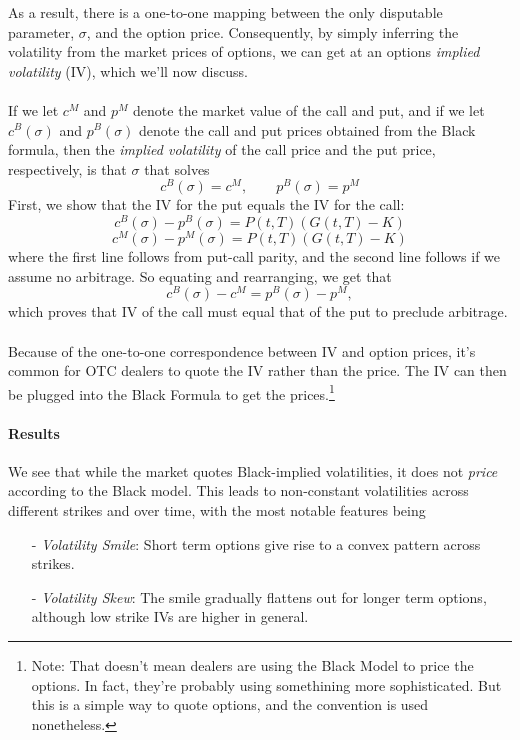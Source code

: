 \documentclass[12pt]{article}
\theoremstyle{plain}
\theoremstyle{definition}
\theoremstyle{remark}
\begin{document}
As a result, there is a one-to-one
mapping between the only disputable parameter, $\sigma$, and the
option price. Consequently, by simply inferring the volatility from the
market prices of options, we can get at an options \emph{implied 
volatility} (IV), which we'll now discuss.
\\
\\
If we let $c^M$ and $p^M$ denote the market value of the call and
put, and if we let $c^B(\sigma)$ and $p^B(\sigma)$ denote the
call and put prices obtained from the Black formula, then the
\emph{implied volatility} of the call
price and the put price, respectively, is that 
$\sigma$ that solves
   \[ c^B(\sigma) = c^M, \qquad p^B(\sigma) = p^M  \]
First, we show that the IV for the put equals the IV for the
call:
   \[ c^B(\sigma) - p^B(\sigma) = P(t,T)(G(t,T) - K) \]
   \[ c^M(\sigma) - p^M(\sigma) = P(t,T)(G(t,T) - K) \]
where the first line follows from put-call parity, 
and the second line follows
if we assume no arbitrage.  So equating and rearranging, we get that
   \[ c^B(\sigma) - c^M = p^B(\sigma) - p^M,\]
which proves that IV of the call must equal that of the put to preclude 
arbitrage. 
\\
\\
Because of the one-to-one correspondence between IV and option 
prices, it's common for OTC dealers to quote the IV rather than the
price.  The IV can then be plugged into the Black Formula to get
the prices.\footnote{Note: That doesn't mean dealers are using the 
Black Model to price the options. In fact, they're probably using 
somethining more sophisticated. But this is a simple way to quote
options, and the convention is used nonetheless.}

\paragraph{Results} We see that while the market quotes Black-implied
volatilities, it does not \emph{price} according to the Black model.
This leads to non-constant volatilities across different strikes
and over time, with the most notable features being
\begin{itemize}
   \item[-] {\sl Volatility Smile}: Short term options give rise to
      a convex pattern across strikes.
   \item[-] {\sl Volatility Skew}: The smile gradually flattens
      out for longer term options, although low strike IVs are
      higher in general.
\end{itemize}
\end{document}
